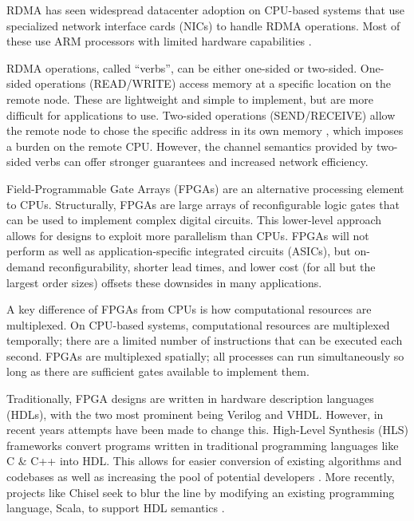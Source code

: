 RDMA has seen widespread datacenter adoption \autocite{strom,mencer-queue-2020}
on CPU-based systems that use specialized network interface cards (NICs) to
handle RDMA operations. Most of these use ARM processors with limited hardware
capabilities \autocite{strom,honeycomb,rdma-reads}.


RDMA operations, called ``verbs'', can be either one-sided or two-sided.
One-sided operations (READ/WRITE) access memory at a specific location on the
remote node. These are lightweight and simple to implement, but are more
difficult for applications to use. Two-sided operations (SEND/RECEIVE) allow the
remote node to chose the specific address in its own memory \autocite{base},
which imposes a burden on the remote CPU. However, the channel semantics
provided by two-sided verbs can offer stronger guarantees and increased network
efficiency.


\label{sec:fpga}

Field-Programmable Gate Arrays (FPGAs) are an alternative processing element to
CPUs. Structurally, FPGAs are large arrays of reconfigurable logic gates that
can be used to implement complex digital circuits. This lower-level approach
allows for designs to exploit more parallelism than CPUs. FPGAs will not perform
as well as application-specific integrated circuits (ASICs), but on-demand
reconfigurability, shorter lead times, and lower cost (for all but the largest
order sizes) offsets these downsides in many applications.

A key difference of FPGAs from CPUs is how computational resources are
multiplexed. On CPU-based systems, computational resources are multiplexed
temporally; there are a limited number of instructions that can be executed each
second. FPGAs are multiplexed spatially; all processes can run simultaneously so
long as there are sufficient gates available to implement them.

Traditionally, FPGA designs are written in hardware description languages
(HDLs), with the two most prominent being Verilog and VHDL. However, in recent
years attempts have been made to change this. High-Level Synthesis (HLS)
frameworks convert programs written in traditional programming languages like C
\& C++ into HDL. This allows for easier conversion of existing algorithms and
codebases as well as increasing the pool of potential developers
\autocite{martin-destest-2009}. More recently, projects like Chisel seek to blur
the line by modifying an existing programming language, Scala, to support HDL
semantics \autocite{chisel}.

